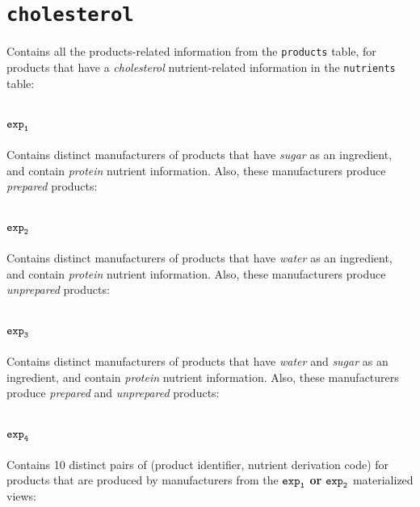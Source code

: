 \section{\texttt{cholesterol}}\label{appendix:sec:cholesterol}
Contains all the products-related information from the \texttt{products} table, for products that have a \textit{cholesterol} nutrient-related information in the \texttt{nutrients} table:



\section{$\texttt{exp}\sb\texttt{1}$}\label{appendix:sec:exp1}
Contains distinct manufacturers of products that have \textit{sugar} as an ingredient, and contain \textit{protein} nutrient information. Also, these manufacturers produce \textit{prepared} products: 



\section{$\texttt{exp}\sb\texttt{2}$}\label{appendix:sec:exp2}
Contains distinct manufacturers of products that have \textit{water} as an ingredient, and contain \textit{protein} nutrient information. Also, these manufacturers produce \textit{unprepared} products: 



\section{$\texttt{exp}\sb\texttt{3}$}\label{appendix:sec:exp3}
Contains distinct manufacturers of products that have \textit{water} and \textit{sugar} as an ingredient, and contain \textit{protein} nutrient information. Also, these manufacturers produce \textit{prepared} and \textit{unprepared} products:



\section{$\texttt{exp}\sb\texttt{4}$}\label{appendix:sec:exp4}
Contains 10 distinct pairs of (product identifier, nutrient derivation code) for products that are produced by manufacturers from the $\texttt{exp}\sb\texttt{1}$ \textbf{or} $\texttt{exp}\sb\texttt{2}$ materialized views:

